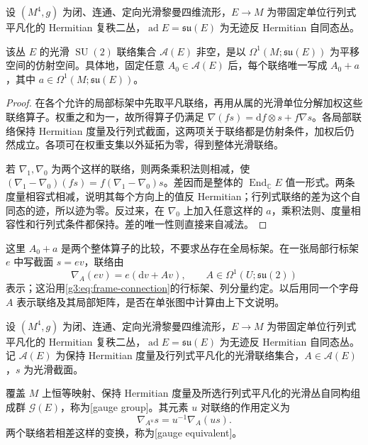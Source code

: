 \begin{proposition}\label{g3:prop:B-affine-connections}
	设 \((M^4,g)\) 为闭、连通、定向光滑黎曼四维流形，\(E\to M\) 为带固定单位行列式平凡化的 Hermitian 复秩二丛，\(\operatorname{ad}E=\mathfrak{su}(E)\) 为无迹反 Hermitian 自同态丛。

	该丛 \(E\) 的光滑 \(\operatorname{SU}(2)\) 联络集合 \(\mathcal A(E)\) 非空，是以
	\(\Omega^1(M;\mathfrak{su}(E))\) 为平移空间的仿射空间。具体地，固定任意 \(A_0\in\mathcal A(E)\) 后，每个联络唯一写成 \(A_0+a\)，其中 \(a\in\Omega^1(M;\mathfrak{su}(E))\)。
\end{proposition}
\begin{proof}
	在各个允许的局部标架中先取平凡联络，再用从属的光滑单位分解加权这些联络算子。权重之和为一，故所得算子仍满足
	\(\nabla(fs)=\mathrm df\otimes s+f\nabla s\)。各局部联络保持 Hermitian 度量及行列式截面，这两项关于联络都是仿射条件，加权后仍然成立。各项可在权重支集以外延拓为零，得到整体光滑联络。

	若 \(\nabla_1,\nabla_0\) 为两个这样的联络，则两条乘积法则相减，使
	\((\nabla_1-\nabla_0)(fs)=f(\nabla_1-\nabla_0)s\)。差因而是整体的 \(\operatorname{End}_{\mathbb C}E\) 值一形式。两条度量相容式相减，说明其每个方向上的值反 Hermitian；行列式联络的差为这个自同态的迹，所以迹为零。反过来，在 \(\nabla_0\) 上加入任意这样的 \(a\)，乘积法则、度量相容性和行列式条件都保持。差的唯一性则直接来自减法。
\end{proof}

这里 \(A_0+a\) 是两个整体算子的比较，不要求丛存在全局标架。在一张局部行标架 \(e\) 中写截面 \(s=ev\)，联络由
\[
	\nabla_A(ev)=e(\mathrm dv+Av),\qquad
	A\in\Omega^1(U;\mathfrak{su}(2))
\]
表示；这沿用\cref{g3:eq:frame-connection}的行标架、列分量约定。以后用同一个字母 \(A\) 表示联络及其局部矩阵，是否在单张图中计算由上下文说明。

\begin{definition}\label{g3:def:B-gauge-group}
	设 \((M^4,g)\) 为闭、连通、定向光滑黎曼四维流形，\(E\to M\) 为带固定单位行列式平凡化的 Hermitian 复秩二丛，\(\operatorname{ad}E=\mathfrak{su}(E)\) 为无迹反 Hermitian 自同态丛。
	记 \(\mathcal A(E)\) 为保持 Hermitian 度量及行列式平凡化的光滑联络集合，\(A\in\mathcal A(E)\)，\(s\) 为光滑截面。

	覆盖 \(M\) 上恒等映射、保持 Hermitian 度量及所选行列式平凡化的光滑丛自同构组成群 \(\mathcal G(E)\)，称为[gauge group]。其元素 \(u\) 对联络的作用定义为
	\[
		\nabla_{A^u}s=u^{-1}\nabla_A(us).
	\]
	两个联络若相差这样的变换，称为[gauge equivalent]。
\end{definition}


